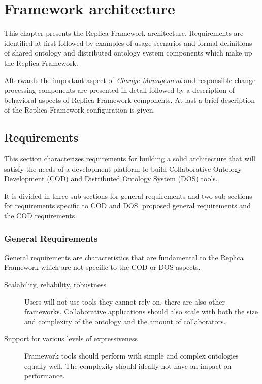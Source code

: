 \chapter{Framework architecture}
This chapter presents the Replica Framework architecture. Requirements are identified
at first followed by examples of usage scenarios and formal
definitions of shared ontology and distributed ontology system components which make up the
Replica Framework.

Afterwards the important aspect of \emph{Change Management} and responsible
change processing components are presented in detail followed by a description
of behavioral aspects of Replica Framework components.
At last a brief description of the Replica Framework configuration is given.


\section{Requirements}
\label{requirements}
This section characterizes requirements for building a solid architecture that
will satisfy the needs of a development platform to build Collaborative Ontology Development (COD) and Distributed Ontology System (DOS) tools.

It is divided in three sub sections for general requirements and two
sub sections for requirements specific to COD and DOS.
\cite{tudorache2010CollabProtege} proposed general requirements and the COD requirements.

\subsection{General Requirements}
General requirements are characteristics that are fundamental to the
Replica Framework which are not specific to the COD or DOS aspects.
\begin{description}
\item[Scalability, reliability, robustness]
                Users will not use tools they cannot rely on, there are also
                other frameworks. Collaborative applications should also scale
                with both the size and complexity of the ontology and the
                amount of collaborators.
\item[Support for various levels of expressiveness]
                Framework tools should perform with simple and complex ontologies
                equally well. The complexity should ideally not have an impact
                on performance.
\end{description}


